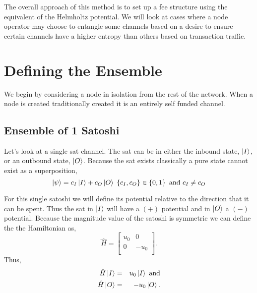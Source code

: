 \documentclass[review,12pt]{elsarticle}
\begin{document}
The overall approach of this method is to set up a fee structure using the equivalent of the Helmholtz potential.
We will look at cases where a node operator may choose to entangle some channels based on a desire to ensure certain channels have a higher entropy than others based on transaction traffic.

\section{Defining the Ensemble}
We begin by considering a node in isolation from the rest of the network.
When a node is created traditionally created it is an entirely self funded channel.

\subsection{Ensemble of 1 Satoshi}
Let's look at a single sat channel.
The sat can be in either the inbound state, $\Ket{I}$, or an outbound state, $\Ket{O}$.
Because the sat exists classically a pure state cannot exist as a superposition,
\begin{equation}
  \Ket{\psi} = c_I\Ket{I} + c_O\Ket{O} \; \left\{c_I,c_O\right\} \in \left\{0,1\right\} \textrm{ and } c_I \neq c_O \nonumber
\end{equation}

For this single satoshi we will define its potential relative to the direction that it can be spent.
Thus the sat in $\Ket{I}$ will have a $(+)$ potential and in $\Ket{O}$ a $(-)$ potential.
Because the magnitude value of the satoshi is symmetric we can define the the Hamiltonian as,
\begin{equation}
  \hat{H} =   \left[ {\begin{array}{cc}
          u_0 & 0    \\
          0   & -u_0 \\
        \end{array} } \right].\nonumber
\end{equation}
Thus,
\begin{eqnarray}
  \hat{H}\Ket{I} & = & u_0\Ket{I} \textrm{ and} \nonumber\\
  \hat{H}\Ket{O} & = & -u_0\Ket{O}. \nonumber
\end{eqnarray}
\end{document}
